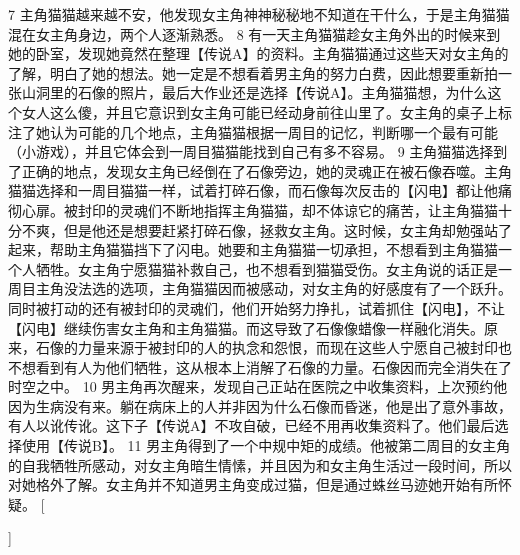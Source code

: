 {{{        }
        {7}{
            主角猫猫越来越不安，他发现女主角神神秘秘地不知道在干什么，于是主角猫猫混在女主角身边，两个人逐渐熟悉。
        }
        {8}{
            有一天主角猫猫趁女主角外出的时候来到她的卧室，发现她竟然在整理【传说A】的资料。主角猫猫通过这些天对女主角的了解，明白了她的想法。她一定是不想看着男主角的努力白费，因此想要重新拍一张山洞里的石像的照片，最后大作业还是选择【传说A】。主角猫猫想，为什么这个女人这么傻，并且它意识到女主角可能已经动身前往山里了。女主角的桌子上标注了她认为可能的几个地点，主角猫猫根据一周目的记忆，判断哪一个最有可能（小游戏），并且它体会到一周目猫猫能找到自己有多不容易。
        }
        {9}{
            主角猫猫选择到了正确的地点，发现女主角已经倒在了石像旁边，她的灵魂正在被石像吞噬。主角猫猫选择和一周目猫猫一样，试着打碎石像，而石像每次反击的【闪电】都让他痛彻心扉。被封印的灵魂们不断地指挥主角猫猫，却不体谅它的痛苦，让主角猫猫十分不爽，但是他还是想要赶紧打碎石像，拯救女主角。这时候，女主角却勉强站了起来，帮助主角猫猫挡下了闪电。她要和主角猫猫一切承担，不想看到主角猫猫一个人牺牲。女主角宁愿猫猫补救自己，也不想看到猫猫受伤。女主角说的话正是一周目主角没法选的选项，主角猫猫因而被感动，对女主角的好感度有了一个跃升。同时被打动的还有被封印的灵魂们，他们开始努力挣扎，试着抓住【闪电】，不让【闪电】继续伤害女主角和主角猫猫。而这导致了石像像蜡像一样融化消失。原来，石像的力量来源于被封印的人的执念和怨恨，而现在这些人宁愿自己被封印也不想看到有人为他们牺牲，这从根本上消解了石像的力量。石像因而完全消失在了时空之中。
        }
        {10}{
            男主角再次醒来，发现自己正站在医院之中收集资料，上次预约他因为生病没有来。躺在病床上的人并非因为什么石像而昏迷，他是出了意外事故，有人以讹传讹。这下子【传说A】不攻自破，已经不用再收集资料了。他们最后选择使用【传说B】。
        }
        {11}{
            男主角得到了一个中规中矩的成绩。他被第二周目的女主角的自我牺牲所感动，对女主角暗生情愫，并且因为和女主角生活过一段时间，所以对她格外了解。女主角并不知道男主角变成过猫，但是通过蛛丝马迹她开始有所怀疑。
        }
    }[\PackageError{tree}{Undefined option to tree: #1}{}]%
}

